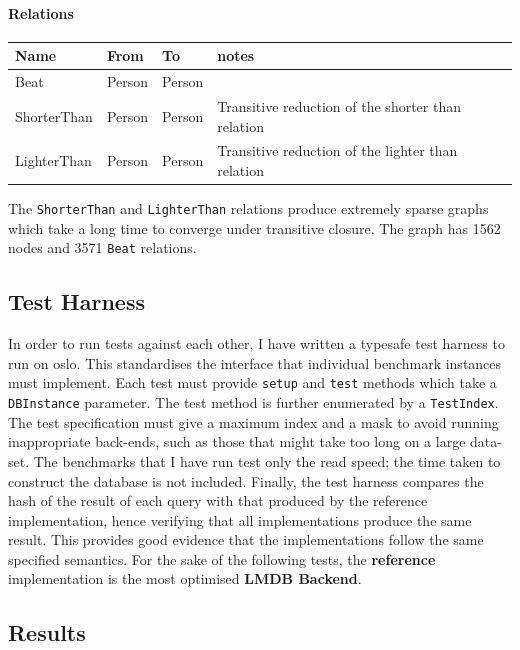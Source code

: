 \documentclass[12pt,a4paper,twoside,openright]{report}
\newcommand\codeName[1]{\texttt{#1}}
\let\oldparagraph\paragraph
\renewcommand{\paragraph}[1]{\oldparagraph{#1}\mbox{}}
\begin{document}
\paragraph{Relations}
\begin{center}
	\begin{tabular}{ |p{3cm}|| p{2cm}| p{2cm}||p{3cm}|}
	\hline
		Name &  From & To & notes \\ \hline
		Beat & Person & Person & \\ \hline
		ShorterThan &  Person & Person & Transitive reduction of the shorter than relation \\ \hline
		LighterThan & Person & Person & Transitive reduction of the lighter than relation \\ \hline

	\end{tabular}
\end{center}
		
		The \codeName{ShorterThan} and \codeName{LighterThan} relations produce extremely sparse graphs which take a long time to converge under transitive closure. The graph has 1562 nodes and 3571 \codeName{Beat} relations.
	\subsection{Test Harness}
	In order to run tests against each other, I have written a typesafe test harness to run on oslo. This standardises the interface that individual benchmark instances must implement. Each test must provide  \codeName{setup} and \codeName{test} methods which take a \codeName{DBInstance} parameter. The test method is further enumerated by a \codeName{TestIndex}. The test specification must give a maximum index and a mask to avoid running inappropriate back-ends, such as those that might take too long on a large data-set. The benchmarks that I have run test only the read speed; the time taken to construct the database is not included. Finally, the test harness compares the hash of the result of each query with that produced by the reference implementation, hence verifying that all implementations produce the same result. This provides good evidence that the implementations follow the same specified semantics. For the sake of the following tests, the \textbf{reference} implementation is the most optimised \textbf{LMDB Backend}.
	
	\subsection{Results}
\end{document}
